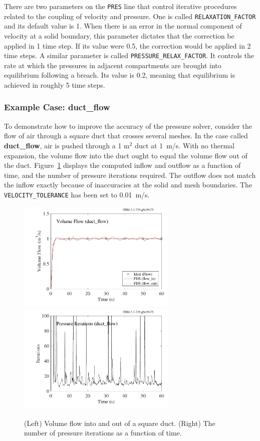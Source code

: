 \documentclass[11pt]{book}
\newcommand{\ct}{\tt\small}
\begin{document}
There are two parameters on the {\ct PRES} line that control iterative procedures related to the coupling of velocity and pressure. One is
called {\ct RELAXATION\_FACTOR} and its default value is 1. When there is an error in the normal component of velocity at a solid boundary, this
parameter dictates that the correction be applied in 1 time step. If its value were 0.5, the correction would be applied in 2 time steps. A similar
parameter is called {\ct PRESSURE\_RELAX\_FACTOR}. It controls the rate at which the pressures in adjacent compartments are brought into equilibrium following a
breach. Its value is 0.2, meaning that equilibrium is achieved in roughly 5 time steps.

\subsubsection{Example Case: {\bf duct\_flow}}

To demonstrate how to improve the accuracy of the pressure solver, consider the flow of air through a square duct that crosses several meshes. In the
case called {\bf duct\_flow}, air is pushed through a 1 m$^2$ duct at 1~m/s. With no thermal expansion, the volume flow into the duct ought to equal the volume flow out of the
duct. Figure~\ref{duct_flow} displays the computed inflow and outflow as a function of time, and the number of pressure iterations required. The outflow does not match
the inflow exactly because of inaccuracies at the solid and mesh boundaries. The {\ct VELOCITY\_TOLERANCE} has been set to 0.01~m/s.

\begin{figure}[ht]
\begin{center}
\includegraphics[width=3in]{SCRIPT_FIGURES/duct_flow}
\includegraphics[width=3in]{SCRIPT_FIGURES/duct_flow_iterations}
\end{center}
\caption[Simple example of flow through a duct.]{(Left) Volume flow into and out of a square duct. (Right) The number of pressure iterations as a function of time.}
\label{duct_flow}
\end{figure}
\end{document}
